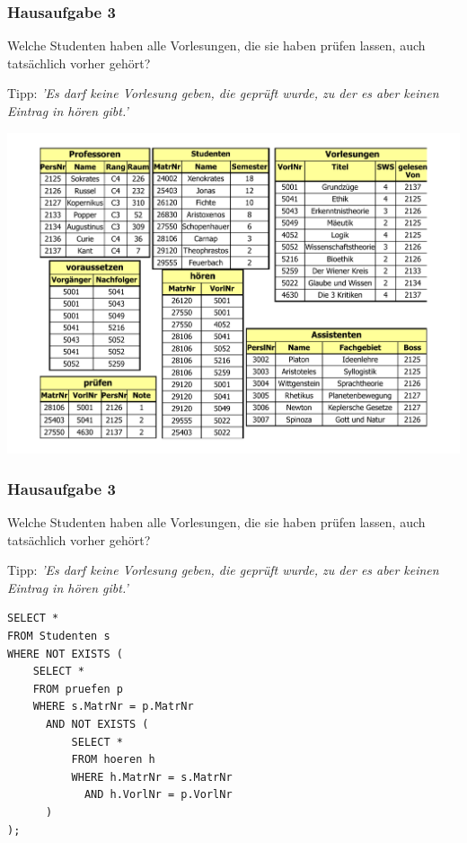 \begin{frame}[fragile]
\frametitle{Hausaufgabe 3}
\vspace{0.5cm}

\begin{multicols}{2}
	Welche Studenten haben alle Vorlesungen, 
	die sie haben prüfen lassen, auch tatsächlich vorher gehört?

	Tipp: \textit{'Es darf keine Vorlesung geben, die geprüft wurde, 
	zu der es aber keinen Eintrag in hören gibt.'}
	\vfill\columnbreak

	\begin{center}
		\includegraphics[height=.6\paperheight]{../img/uni.pdf}
	\end{center}
\end{multicols}
\end{frame}

\begin{frame}[fragile]
\frametitle{Hausaufgabe 3}
\vspace{0.5cm}

\begin{multicols}{2}
	Welche Studenten haben alle Vorlesungen, 
	die sie haben prüfen lassen, auch tatsächlich vorher gehört?

	Tipp: \textit{'Es darf keine Vorlesung geben, die geprüft wurde, 
	zu der es aber keinen Eintrag in hören gibt.'}
	\vfill\columnbreak

	\begin{verbatim}
SELECT *
FROM Studenten s
WHERE NOT EXISTS (
	SELECT *
	FROM pruefen p
	WHERE s.MatrNr = p.MatrNr
	  AND NOT EXISTS (
		  SELECT *
		  FROM hoeren h
		  WHERE h.MatrNr = s.MatrNr
		    AND h.VorlNr = p.VorlNr
	  )
);
	\end{verbatim}
\end{multicols}
\end{frame}

